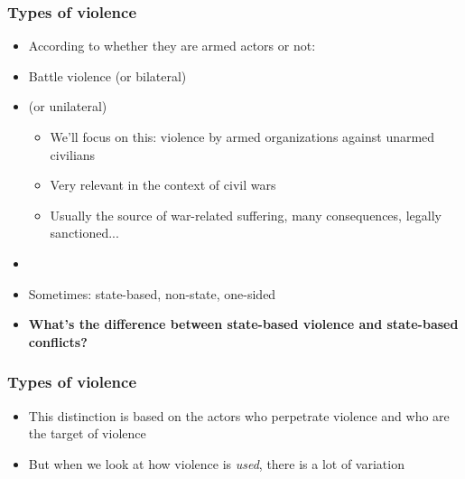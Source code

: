 \documentclass[aspectratio=43]{beamer}
\begin{document}
\begin{frame}
\frametitle{Types of violence}
\centering

\begin{itemize}
  \item<1->[] According to whether they are armed actors or not:
  \item<2-> Battle violence (or bilateral)
  \item<2->  (or unilateral)
  \begin{itemize}
    \item<3-> We'll focus on this: violence by armed organizations against unarmed civilians
    \item<3-> Very relevant in the context of civil wars
    \item<3-> Usually the source of war-related suffering, many consequences, legally sanctioned...
  \end{itemize}
  \item[]
  \item<4-> Sometimes: state-based, non-state, one-sided
  \item<5-> \textbf{What's the difference between state-based violence and state-based conflicts?}
\end{itemize}

\end{frame}

\begin{frame}
\frametitle{Types of violence}
\centering

\begin{itemize}[<+->]
  \item This distinction is based on the actors who perpetrate violence and who are the target of violence
  \item But when we look at how violence is \textit{used}, there is a lot of variation
\end{itemize}


\end{frame}
\end{document}
